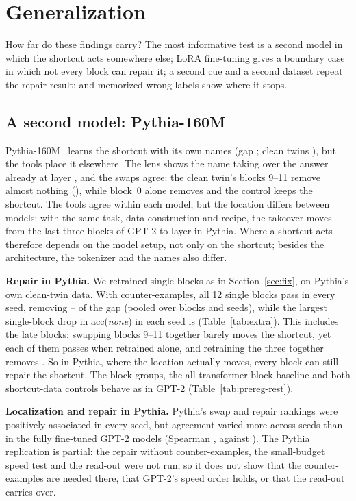 \section{Generalization}
\label{sec:generalize}

How far do these findings carry? The most informative test is a second model in which the shortcut acts somewhere
else; LoRA fine-tuning gives a boundary case in which not every block can repair it; a second cue and a second dataset
repeat the repair result; and memorized wrong labels show where it stops.

\subsection{A second model: Pythia-160M}
\label{sec:pythia}
Pythia-160M~\cite{biderman2023pythia} learns the shortcut with its own names (gap \gapPythiaRange; clean twins
\gapPythiaCleanRange), but the tools place it elsewhere. The lens shows the name taking over the answer already at
layer \pyTakeoverPythiaRange, and the swaps agree: the clean twin's blocks 9--11 remove almost nothing
(\pySwapRemovedLatePythiaRange), while block~0 alone removes \pySwapRemovedBZeroPythiaRange{} and the control keeps the
shortcut. The tools agree within each model, but the location differs between models: with the same task, data
construction and recipe, the takeover moves from the last three blocks of GPT-2 to layer \pyTakeoverPythiaRange{} in
Pythia. Where a shortcut acts therefore depends on the model setup, not only on the shortcut; besides the
architecture, the tokenizer and the names also differ.

\textbf{Repair in Pythia.} We retrained single blocks as in Section~\ref{sec:fix}, on Pythia's own clean-twin data.
With counter-examples, all 12 single blocks pass in every seed, removing
\pyRetrainSingleMinPythia--\pyRetrainSingleMaxPythia{} of the gap (pooled over blocks and seeds), while the largest
single-block drop in acc(\textit{none}) in each seed is \pyRetrainMaxDropPythiaRange{} (Table~\ref{tab:extra}). This includes
the late blocks: swapping blocks 9--11 together barely moves the shortcut, yet each of them passes when retrained alone,
and retraining the three together removes \pyRetrainRemovedLatePythiaRange. So in Pythia, where the location
actually moves, every block can still repair the shortcut.
The block groups, the all-transformer-block baseline and both shortcut-data controls behave as in GPT-2
(Table~\ref{tab:prereg-rest}).

\textbf{Localization and repair in Pythia.} Pythia's swap and repair rankings were positively associated in every seed,
but agreement varied more across seeds than in the fully fine-tuned GPT-2 models (Spearman
\pyRetrainSpearmanPythiaRange, against \spearmanSwapRetrainFullFTRange). The Pythia replication is partial: the repair without counter-examples, the small-budget speed test and
the read-out were not run, so it does not show that the counter-examples are needed there, that GPT-2's speed order
holds, or that the read-out carries over.

